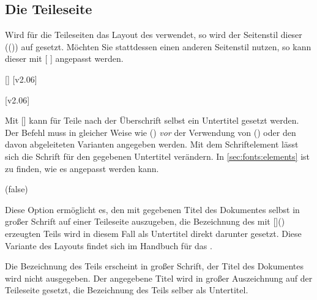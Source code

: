 \begin{DeclareEntity*}{}
\begin{DeclareEntity*}{}
\begin{DeclareEntity*}{}
\subsection{%
  Die Teileseite%
  \label{sec:part}%
}

%
Wird für die Teileseiten das Layout des \CDs verwendet, so wird der Seitenstil 
dieser (()) auf 
 gesetzt. Möchten Sie stattdessen einen anderen 
Seitenstil nutzen, so kann dieser mit 
[%
]
angepasst werden.

\begin{Declaration}
  {[]}
  [v2.06]
\begin{Declaration}
  {}
  [v2.06]
\printdeclarationlist[Schriftelemente]

Mit [] kann für Teile nach der 
Überschrift selbst ein Untertitel gesetzt werden. Der Befehl muss in gleicher 
Weise wie () \emph{vor} der 
Verwendung von () oder den davon abgeleiteten 
Varianten angegeben werden. Mit dem Schriftelement  lässt 
sich die Schrift für den gegebenen Untertitel verändern. In 
\autoref{sec:fonts:elements} ist zu finden, wie es angepasst werden kann.
\end{Declaration}
\end{Declaration}

\begin{Declaration}
  {}
  (false)
\printdeclarationlist

Diese Option ermöglicht es, den mit  gegebenen Titel des 
Dokumentes selbst in großer Schrift auf einer Teileseite auszugeben, die 
Bezeichnung des mit []() 
erzeugten Teils wird in diesem Fall als Untertitel direkt darunter gesetzt. 
Diese Variante des Layouts findet sich im Handbuch für das \TUDCD. 
\notudscrartcl
\begin{DeclareValues}
  Die Bezeichnung des Teils erscheint in großer Schrift, der Titel des 
  Dokumentes wird nicht ausgegeben.
  Der angegebene Titel wird in großer Auszeichnung auf der Teileseite gesetzt,
  die Bezeichnung des Teils selber als Untertitel.
\end{DeclareValues}
\end{Declaration}
%
%




\end{DeclareEntity*}
\end{DeclareEntity*}
\end{DeclareEntity*}
